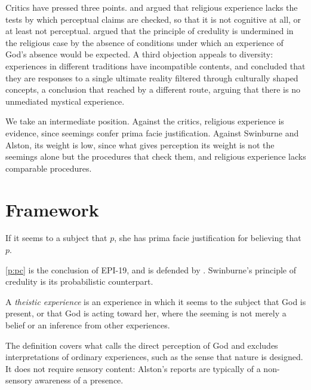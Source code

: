 \documentclass{situationist-preprint}
\begin{document}
Critics have pressed three points. \citet{Martin1959} and \citet{Gale1991} argued that religious experience lacks the tests by which perceptual claims are checked, so that it is not cognitive at all, or at least not perceptual. \citet{Rowe1982} argued that the principle of credulity is undermined in the religious case by the absence of conditions under which an experience of God's absence would be expected. A third objection appeals to diversity: experiences in different traditions have incompatible contents, and \citet{Hick1989} concluded that they are responses to a single ultimate reality filtered through culturally shaped concepts, a conclusion that \citet{Katz1978} reached by a different route, arguing that there is no unmediated mystical experience.

We take an intermediate position. Against the critics, religious experience is evidence, since seemings confer prima facie justification. Against Swinburne and Alston, its weight is low, since what gives perception its weight is not the seemings alone but the procedures that check them, and religious experience lacks comparable procedures.

\section{Framework}

\begin{principle}\label{p:pc}
If it seems to a subject that $p$, she has prima facie justification for believing that $p$.
\end{principle}

\ref{p:pc} is the conclusion of EPI-19, and is defended by \citet{Huemer2007}. Swinburne's principle of credulity is its probabilistic counterpart.

\begin{definition}\label{d:rel}
A \emph{theistic experience} is an experience in which it seems to the subject that God is present, or that God is acting toward her, where the seeming is not merely a belief or an inference from other experiences.
\end{definition}

The definition covers what \citet{Alston1991} calls the direct perception of God and excludes interpretations of ordinary experiences, such as the sense that nature is designed. It does not require sensory content: Alston's reports are typically of a non-sensory awareness of a presence.
\end{document}
